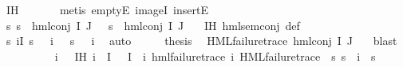 \begin{isabellebody}
\ IH\ \isanewline
\ \ \ \ \isamarkupfalse%
\ {\isacharparenleft}{\kern0pt}metis\ emptyE\ imageI\ insertE{\isacharparenright}{\kern0pt}\isanewline
\ \ \isamarkupfalse%
\ {\isachardoublequoteopen}{\isacharparenleft}{\kern0pt}{\isasymforall}s{\isachardot}{\kern0pt}\ {\isacharparenleft}{\kern0pt}s\ {\isasymTurnstile}\ hml{\isacharunderscore}{\kern0pt}conj\ I\ J\ {\isasymPhi}{\isacharparenright}{\kern0pt}\ {\isacharequal}{\kern0pt}\ {\isacharparenleft}{\kern0pt}s\ {\isasymTurnstile}\ {\isacharparenleft}{\kern0pt}hml{\isacharunderscore}{\kern0pt}conj\ I\ J\ {\isasymPsi}{\isacharparenright}{\kern0pt}{\isacharparenright}{\kern0pt}{\isacharparenright}{\kern0pt}{\isachardoublequoteclose}\ \isamarkupfalse%
\ IH\ hml{\isacharunderscore}{\kern0pt}sem{\isacharunderscore}{\kern0pt}conj\ {\isasymPsi}{\isacharunderscore}{\kern0pt}def\ \isanewline
\ \ \ \ \isamarkupfalse%
\ {\isacartoucheopen}{\isasymforall}s{\isachardot}{\kern0pt}\ {\isasymforall}i{\isasymin}I{\isachardot}{\kern0pt}\ {\isacharparenleft}{\kern0pt}s\ {\isasymTurnstile}\ {\isasymPsi}\ i{\isacharparenright}{\kern0pt}\ {\isasymnoteq}\ {\isacharparenleft}{\kern0pt}{\isasymnot}\ s\ {\isasymTurnstile}\ {\isasymPhi}\ i{\isacharparenright}{\kern0pt}{\isacartoucheclose}\ \isamarkupfalse%
\ auto\isanewline
\ \ \isamarkupfalse%
\ \isamarkupfalse%
\ {\isacharquery}{\kern0pt}thesis\ \isamarkupfalse%
\ {\isacartoucheopen}HML{\isacharunderscore}{\kern0pt}failure{\isacharunderscore}{\kern0pt}trace\ {\isacharparenleft}{\kern0pt}hml{\isacharunderscore}{\kern0pt}conj\ I\ J\ {\isasymPsi}{\isacharparenright}{\kern0pt}{\isacartoucheclose}\ \isamarkupfalse%
\ blast\isanewline
{}\isamarkupfalse%
\isanewline
\ \ \isamarkupfalse%
\ {}\isanewline
\ \ \isamarkupfalse%
\ \isamarkupfalse%
\ i\ {\isasympsi}\ \ IH{\isacharcolon}{\kern0pt}\ {\isachardoublequoteopen}i{\isasymin}{\isasymPhi}\ {\isacharbackquote}{\kern0pt}\ I{\isachardoublequoteclose}\ {\isachardoublequoteopen}{\isasymPhi}\ {\isacharbackquote}{\kern0pt}\ I\ {\isacharequal}{\kern0pt}\ {\isacharbraceleft}{\kern0pt}i{\isacharbraceright}{\kern0pt}{\isachardoublequoteclose}\ {\isachardoublequoteopen}hml{\isacharunderscore}{\kern0pt}failure{\isacharunderscore}{\kern0pt}trace\ i{\isachardoublequoteclose}\ {\isachardoublequoteopen}HML{\isacharunderscore}{\kern0pt}failure{\isacharunderscore}{\kern0pt}trace\ {\isasympsi}{\isachardoublequoteclose}\ {\isachardoublequoteopen}{\isacharparenleft}{\kern0pt}{\isasymforall}s{\isachardot}{\kern0pt}\ {\isacharparenleft}{\kern0pt}s\ {\isasymTurnstile}\ i{\isacharparenright}{\kern0pt}\ {\isacharequal}{\kern0pt}\ {\isacharparenleft}{\kern0pt}s\ {\isasymTurnstile}\ {\isasympsi}{\isacharparenright}{\kern0pt}{\isacharparenright}{\kern0pt}{\isachardoublequoteclose}\isanewline

\end{isabellebody}
